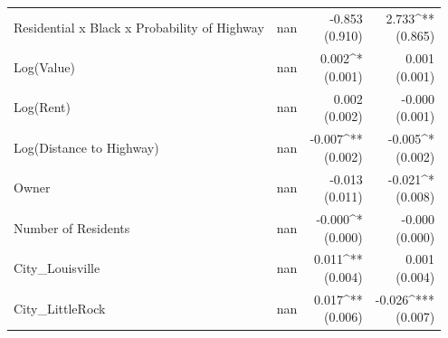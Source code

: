 \begin{table}[h]
\begin{tabular*}{\textwidth}{@{\extracolsep{\fill}}l*{3}{r}}
Residential x Black x Probability of Highway & nan & \makecell[tr]{-0.853 \\ (0.910)} & \makecell[tr]{2.733^{**} \\ (0.865)} \\
Log(Value) & nan & \makecell[tr]{0.002^{*} \\ (0.001)} & \makecell[tr]{0.001 \\ (0.001)} \\
Log(Rent) & nan & \makecell[tr]{0.002 \\ (0.002)} & \makecell[tr]{-0.000 \\ (0.001)} \\
Log(Distance to Highway) & nan & \makecell[tr]{-0.007^{**} \\ (0.002)} & \makecell[tr]{-0.005^{*} \\ (0.002)} \\
Owner & nan & \makecell[tr]{-0.013 \\ (0.011)} & \makecell[tr]{-0.021^{*} \\ (0.008)} \\
Number of Residents & nan & \makecell[tr]{-0.000^{*} \\ (0.000)} & \makecell[tr]{-0.000 \\ (0.000)} \\
City_Louisville & nan & \makecell[tr]{0.011^{**} \\ (0.004)} & \makecell[tr]{0.001 \\ (0.004)} \\
City_LittleRock & nan & \makecell[tr]{0.017^{**} \\ (0.006)} & \makecell[tr]{-0.026^{***} \\ (0.007)} \\
\bottomrule
\end{tabular*}
\end{table}
